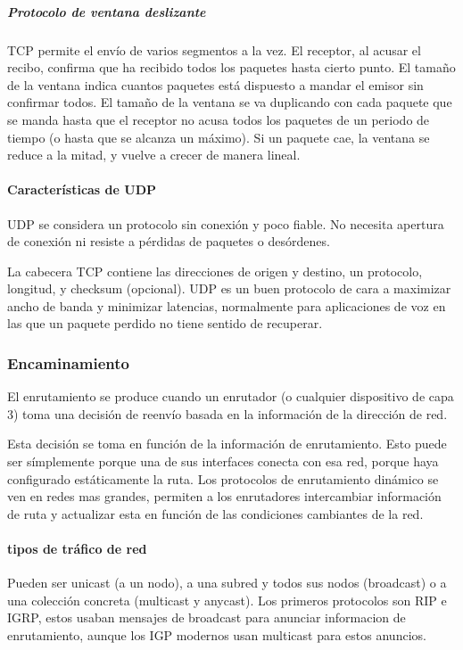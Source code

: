             \subparagraph{Protocolo de ventana deslizante}
                TCP permite el envío de varios segmentos a la vez. El receptor, al acusar el recibo, confirma que ha recibido todos los paquetes hasta cierto punto. El tamaño de la ventana indica cuantos paquetes está dispuesto a mandar el emisor sin confirmar todos. El tamaño de la ventana se va duplicando con cada paquete que se manda hasta que el receptor no acusa todos los paquetes de un periodo de tiempo (o hasta que se alcanza un máximo). Si un paquete cae, la ventana se reduce a la mitad, y vuelve a crecer de manera lineal. 

        \paragraph{Características de UDP} %
            UDP se considera un protocolo sin conexión y poco fiable. No necesita apertura de conexión ni resiste a pérdidas de paquetes o desórdenes. 

            La cabecera TCP contiene las direcciones de origen y destino, un protocolo, longitud, y checksum (opcional). UDP es un buen protocolo de cara a maximizar ancho de banda y minimizar latencias, normalmente para aplicaciones de voz en las que un paquete perdido no tiene sentido de recuperar.

    \subsubsection{Encaminamiento} %
                El enrutamiento se produce cuando un enrutador (o cualquier dispositivo de capa 3) toma una decisión de reenvío basada en la información de la dirección de red.

                Esta decisión se toma en función de la información de enrutamiento. Esto puede ser símplemente porque una de sus interfaces conecta con esa red, porque haya configurado estáticamente la ruta. Los protocolos de enrutamiento dinámico se ven en redes mas grandes, permiten a los enrutadores intercambiar información de ruta y actualizar esta en función de las condiciones cambiantes de la red.

        \paragraph{tipos de tráfico de red}
            Pueden ser unicast (a un nodo), a una subred y todos sus nodos (broadcast) o a una colección concreta (multicast y anycast). Los primeros protocolos son RIP e IGRP, estos usaban mensajes de broadcast para anunciar informacion de enrutamiento, aunque los IGP modernos usan multicast para estos anuncios.

